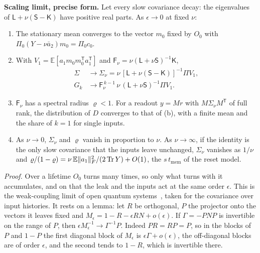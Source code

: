 \begin{keybox}
\textbf{Scaling limit, precise form.} Let every slow covariance decay: the eigenvalues of
$\mathsf L+\nu(\mathsf S-\mathsf K)$ have positive real parts. As $\epsilon\to0$ at fixed $\nu$:
\begin{enumerate}[label=(\alph*),leftmargin=*,itemsep=1pt,topsep=3pt]
\item The stationary mean converges to the vector $m_0$ fixed by $O_0$ with
  $\Pi_0(Y-\nu\bar a_2)m_0=\Pi_0c_0$.
\item With $V_1=\mathbb E[a_1m_0m_0^{\mathsf T}a_1^{\mathsf T}]$ and
  $\mathsf F_\nu=\nu(\mathsf L+\nu\mathsf S)^{-1}\mathsf K$,
  \begin{equation*}
    \begin{aligned}
      \Sigma&\to\Sigma_\nu=\nu\,[\mathsf L+\nu(\mathsf S-\mathsf K)]^{-1}\Pi V_1,\\
      G_k&\to\mathsf F_\nu^{\,k-1}\,\nu\,(\mathsf L+\nu\mathsf S)^{-1}\Pi V_1 .
    \end{aligned}
  \end{equation*}
\item $\mathsf F_\nu$ has a spectral radius $\varrho<1$. For a readout $y=Mr$ with $M\Sigma_\nu M^{\mathsf T}$ of full
  rank, the distribution of $D$ converges to that of (b), with a finite mean and the share of $k=1$ for single inputs.
\item As $\nu\to0$, $\Sigma_\nu$ and $\varrho$ vanish in proportion to $\nu$. As $\nu\to\infty$, if the identity is
  the only slow covariance that the inputs leave unchanged, $\Sigma_\nu$ vanishes as $1/\nu$ and
  $\varrho/(1-\varrho)=\nu\,\mathbb E\|a_1\|_F^2/(2\operatorname{Tr} Y)+O(1)$, the $s\,t_{\mathrm{mem}}$ of the reset model.
\end{enumerate}
\end{keybox}

\emph{Proof.} Over a lifetime $O_0$ turns many times, so only what turns with it accumulates, and on that the leak
and the inputs act at the same order $\epsilon$. This is the weak-coupling limit of open quantum
systems~\cite{Davies1974}, taken for the covariance over input histories. It rests on a lemma: let $R$ be orthogonal,
$P$ the projector onto the vectors it leaves fixed and $M_\epsilon=1-R-\epsilon RN+o(\epsilon)$. If $\Gamma=-PNP$ is
invertible on the range of $P$, then $\epsilon M_\epsilon^{-1}\to\Gamma^{-1}P$. Indeed $PR=RP=P$, so in the blocks of
$P$ and $1-P$ the first diagonal block of $M_\epsilon$ is $\epsilon\Gamma+o(\epsilon)$, the off-diagonal blocks are of
order $\epsilon$, and the second tends to $1-R$, which is invertible there.

